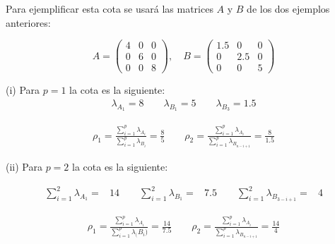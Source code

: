 \begin{example}
Para ejemplificar esta cota se usará las matrices $A$ y $B$ de los dos ejemplos anteriores:


\begin{equation*}
A = \left(\!
    \begin{array}{ccc}
      4 & 0 & 0 \\
      0 & 6 & 0 \\
      0 & 0 & 8 
    \end{array}
  \!\right), \quad
B = \left(\!
    \begin{array}{ccc}
      1.5 & 0 & 0 \\
      0 & 2.5 & 0 \\
      0 & 0 & 5 
    \end{array}
\!\right) 
\end{equation*}


(i) Para $p = 1$ la cota es la siguiente:
\begin{equation*}
\begin{aligned}
  \lambda_{A_1} = 8 \qquad
  \lambda_{B_1} = 5 \qquad
  \lambda_{B_3} = 1.5
\end{aligned}
\end{equation*}

\begin{equation*}
\begin{aligned}
\rho_1 = \frac{\sum_{i = 1}^{p}\lambda_{A_i}}{\sum_{i = 1}^{p}\lambda_{B_i}}  = \frac{8}{5} \qquad
\rho_2 = \frac{\sum_{i = 1}^{p}\lambda_{A_i}}{\sum_{i = 1}^{p}\lambda_{B_{n-i+1}}}  = \frac{8}{1.5}
\end{aligned}
\end{equation*}

(ii) Para $p = 2$ la cota es la siguiente:

\begin{equation*}
\begin{aligned}
\sum_{i = 1}^{2}\lambda_{A_1}  =& 14 \qquad
\sum_{i = 1}^{2}\lambda_{B_1}  =& 7.5 \qquad
\sum_{i = 1}^{2}\lambda_{B_{3-i+1}} =& 4
\end{aligned}
\end{equation*}

\begin{equation*}
\begin{aligned}
\rho_1 = \frac{\sum_{i = 1}^{p}\lambda_{A_i}}{\sum_{i = 1}^{p}\lambda_({B_i)}}
 = \frac{14}{7.5} \qquad
\rho_2 = \frac{\sum_{i = 1}^{p}\lambda_{A_i}}{\sum_{i = 1}^{p}\lambda_{B_{n-i+1}}}  = \frac{14}{4}
\end{aligned}
\end{equation*}




\end{example}
